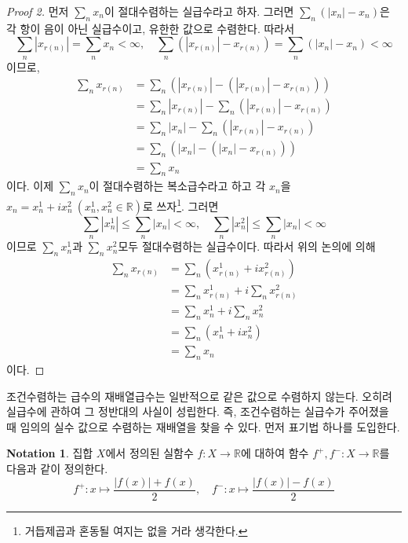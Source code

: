 \documentclass[11pt]{book}
\numberwithin{equation}{chapter}
\def\RR{\mathbb{R}}
\newcommand{\abs}[1]{\left\vert#1\right\vert}
\theoremstyle{definition}
\newtheorem{notn}[thm]{Notation}
\begin{document}
\begin{proof} [Proof 2]
    먼저 \(\sum_n x_n\)이 절대수렴하는 실급수라고 하자. 그러면 \(\sum_n (\abs{x_n} - x_n)\)은 각 항이 음이 아닌 실급수이고, 유한한 값으로 수렴한다. 따라서
    \[
        \sum_n \abs{x_{r(n)}} = \sum_n x_{n} < \infty, \quad \sum_n (\abs{x_{r(n)}} - x_{r(n)}) = \sum_n (\abs{x_n} - x_n) < \infty
    \]
    이므로,
    \begin{align*}
        \sum_n x_{r(n)} &= \sum_n (\abs{x_{r(n)}} - (\abs{x_{r(n)}} - x_{r(n)}))\\
        &= \sum_n \abs{x_{r(n)}} - \sum_n (\abs{x_{r(n)}} - x_{r(n)})\\
        &= \sum_n \abs{x_n} - \sum_n (\abs{x_{r(n)}} - x_{r(n)})\\
        &= \sum_n (\abs{x_n} - (\abs{x_{n}} - x_{r(n)}))\\
        &= \sum_n x_n
    \end{align*}
    이다. 이제 \(\sum_n x_n\)이 절대수렴하는 복소급수라고 하고 각 \(x_n\)을 \(x_n = x_n^1 + ix_n^2 \ (x_n^1, x_n^2 \in \RR)\)로 쓰자\footnote{거듭제곱과 혼동될 여지는 없을 거라 생각한다.}. 그러면
    \[
    \sum_n \abs{x_n^1} \le \sum_n \abs{x_n} < \infty, \quad  \sum_n \abs{x_n^2} \le \sum_n \abs{x_n} < \infty   
    \]
    이므로 \(\sum_n x_n^1\)과 \(\sum_n x_n^2\)모두 절대수렴하는 실급수이다. 따라서 위의 논의에 의해
    \begin{align*}
        \sum_n x_{r(n)} &= \sum_n (x_{r(n)}^1 + ix_{r(n)}^2)\\
        &= \sum_n x_{r(n)}^1 + i \sum_n x_{r(n)}^2 \\
        &= \sum_n x_n^1 + i\sum_n x_n^2\\
        &= \sum_n (x_n^1 + ix_n^2)\\
        &= \sum_n x_n 
    \end{align*}
    이다.
\end{proof}

조건수렴하는 급수의 재배열급수는 일반적으로 같은 값으로 수렴하지 않는다. 오히려 실급수에 관하여 그 정반대의 사실이 성립한다. 즉, 조건수렴하는 실급수가 주어졌을 때 임의의 실수 값으로 수렴하는 재배열을 찾을 수 있다. 먼저 표기법 하나를 도입한다.

\begin{notn}
    집합 \(X\)에서 정의된 실함수 \(f : X \to \RR\)에 대하여 함수 \(f^+, f^- : X \to \RR\)를 다음과 같이 정의한다.
    \[
    f^+ : x \mapsto \frac{\abs{f(x)} + f(x)}{2}, \quad f^- : x \mapsto \frac{\abs{f(x)} - f(x)}{2}  
    \]
\end{notn}
\end{document}
